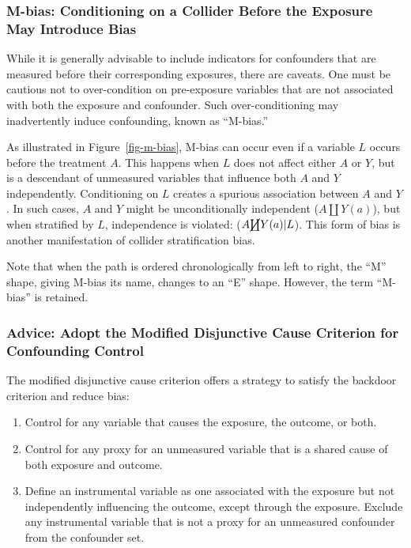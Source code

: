 \documentclass[
  singlecolumn,
  9pt]{article}
\providecommand{\tightlist}{%
  \setlength{\itemsep}{0pt}\setlength{\parskip}{0pt}}\usepackage{longtable,booktabs,array}
\begin{document}
\subsubsection{M-bias: Conditioning on a Collider Before the Exposure
May Introduce
Bias}\label{m-bias-conditioning-on-a-collider-before-the-exposure-may-introduce-bias}

While it is generally advisable to include indicators for confounders
that are measured before their corresponding exposures, there are
caveats. One must be cautious not to over-condition on pre-exposure
variables that are not associated with both the exposure and confounder.
Such over-conditioning may inadvertently induce confounding, known as
``M-bias.''

As illustrated in Figure~\ref{fig-m-bias}, M-bias can occur even if a
variable \(L\) occurs before the treatment \(A\). This happens when
\(L\) does not affect either \(A\) or \(Y\), but is a descendant of
unmeasured variables that influence both \(A\) and \(Y\) independently.
Conditioning on \(L\) creates a spurious association between \(A\) and
\(Y\). In such cases, \(A\) and \(Y\) might be unconditionally
independent (\(A \coprod Y(a)\)), but when stratified by \(L\),
independence is violated: (\(A \cancel{\coprod} Y(a)| L\)). This form of
bias is another manifestation of collider stratification bias.

Note that when the path is ordered chronologically from left to right,
the ``M'' shape, giving M-bias its name, changes to an ``E'' shape.
However, the term ``M-bias'' is retained.

\subsubsection{Advice: Adopt the Modified Disjunctive Cause Criterion
for Confounding
Control}\label{advice-adopt-the-modified-disjunctive-cause-criterion-for-confounding-control}

The modified disjunctive cause criterion offers a strategy to satisfy
the backdoor criterion and reduce bias:

\begin{enumerate}
\def\labelenumi{\alph{enumi}.}
\tightlist
\item
  Control for any variable that causes the exposure, the outcome, or
  both.
\item
  Control for any proxy for an unmeasured variable that is a shared
  cause of both exposure and outcome.
\item
  Define an instrumental variable as one associated with the exposure
  but not independently influencing the outcome, except through the
  exposure. Exclude any instrumental variable that is not a proxy for an
  unmeasured confounder from the confounder set.
\end{enumerate}
\end{document}
